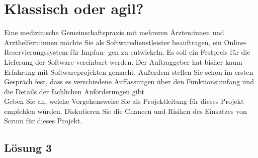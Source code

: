 \documentclass[main.tex]{subfiles}
\begin{document}
\section{Klassisch oder agil?}

Eine medizinische Gemeinschaftspraxis mit mehreren Ärzten:innen und Arzthelfern:innen
möchte Sie als Softwaredienstleister beauftragen, ein Online-Reservierungssystem für Impfun-
gen zu entwickeln. Es soll ein Festpreis für die Lieferung der Software vereinbart werden. Der
Auftraggeber hat bisher kaum Erfahrung mit Softwareprojekten gemacht. Außerdem stellen Sie
schon im ersten Gespräch fest, dass es verschiedene Auffassungen über den Funktionsumfang
und die Details der fachlichen Anforderungen gibt.\\

Geben Sie an, welche Vorgehensweise Sie als Projektleitung für dieses Projekt empfehlen würden.
Diskutieren Sie die Chancen und Risiken des Einsatzes von Scrum für dieses Projekt.

\subsection{Lösung 3}
\end{document}
